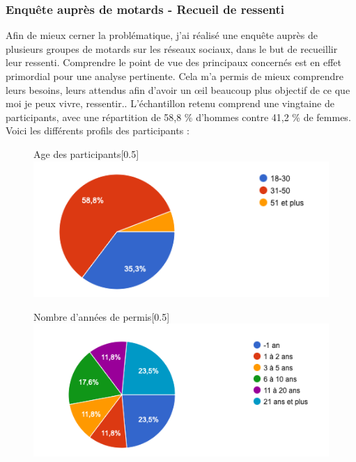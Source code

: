 \subsubsection{Enquête auprès de motards - Recueil de ressenti}
Afin de mieux cerner la problématique, j’ai réalisé une enquête auprès de plusieurs groupes de motards sur les réseaux sociaux, dans le but de recueillir leur ressenti. Comprendre le point de vue des principaux concernés est en effet primordial pour une analyse pertinente. Cela m'a permis de mieux comprendre leurs besoins, leurs attendus afin d'avoir un œil beaucoup plus objectif de ce que moi je peux vivre, ressentir.. L’échantillon retenu comprend une vingtaine de participants, avec une répartition de 58,8 \% d'hommes contre 41,2 \% de femmes.
Voici les différents profils des participants :
\begin{figure}[H]
  \centering
  \begin{subcaptionbox}{Age des participants}[0.5\linewidth]
    {\includegraphics[width=\linewidth]{coeur_memoire/graphique/age.png}}
  \end{subcaptionbox}
  \hfill
  \begin{subcaptionbox}{Nombre d'années de permis}[0.5\linewidth]
    {\includegraphics[width=\linewidth]{coeur_memoire/graphique/nb_annees_permis.png}}
  \end{subcaptionbox}


\end{figure}
